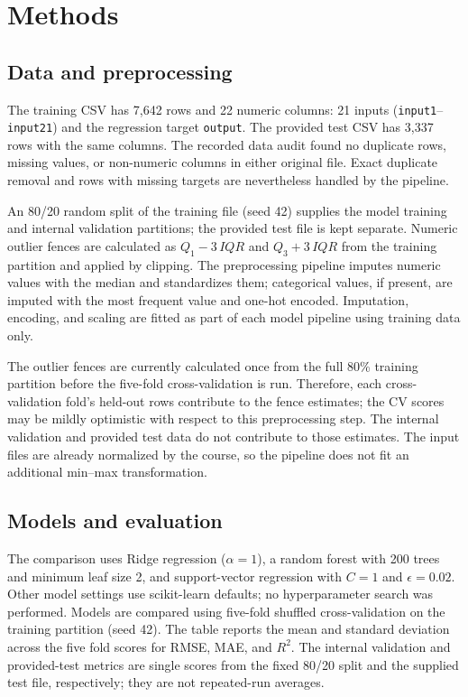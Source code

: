 \documentclass[11pt,a4paper]{article}
\begin{document}
\section{Methods}
\subsection{Data and preprocessing}
The training CSV has 7,642 rows and 22 numeric columns: 21 inputs
(\texttt{input1}--\texttt{input21}) and the regression target
\texttt{output}. The provided test CSV has 3,337 rows with the same columns.
The recorded data audit found no duplicate rows, missing values, or
non-numeric columns in either original file. Exact duplicate removal and
rows with missing targets are nevertheless handled by the pipeline.

An 80/20 random split of the training file (seed 42) supplies the model
training and internal validation partitions; the provided test file is kept
separate. Numeric outlier fences are calculated as $Q_1-3\,IQR$ and
$Q_3+3\,IQR$ from the training partition and applied by clipping. The
preprocessing pipeline imputes numeric values with the median and
standardizes them; categorical values, if present, are imputed with the
most frequent value and one-hot encoded. Imputation, encoding, and scaling
are fitted as part of each model pipeline using training data only.

The outlier fences are currently calculated once from the full 80\%
training partition before the five-fold cross-validation is run. Therefore,
each cross-validation fold's held-out rows contribute to the fence estimates;
the CV scores may be mildly optimistic with respect to this preprocessing
step. The internal validation and provided test data do not contribute to
those estimates. The input files are already normalized by the course, so
the pipeline does not fit an additional min--max transformation.

\subsection{Models and evaluation}
The comparison uses Ridge regression ($\alpha=1$), a random forest with 200
trees and minimum leaf size 2, and support-vector regression with $C=1$ and
$\epsilon=0.02$. Other model settings use scikit-learn defaults; no
hyperparameter search was performed. Models are compared using five-fold
shuffled cross-validation on the training partition (seed 42). The table
reports the mean and standard deviation across the five fold scores for
RMSE, MAE, and $R^2$. The internal validation and provided-test metrics are
single scores from the fixed 80/20 split and the supplied test file,
respectively; they are not repeated-run averages.
\end{document}
